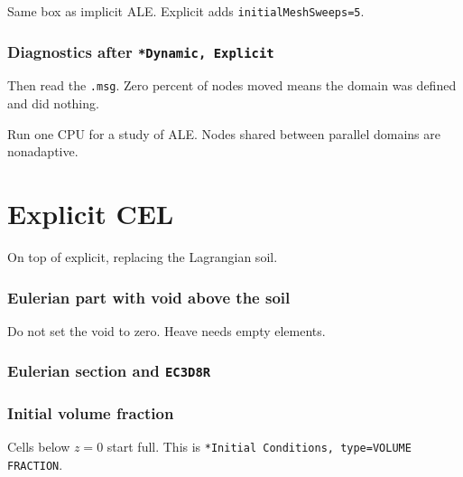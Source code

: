 \documentclass[11pt,a4paper]{article}
\begin{document}
Same box as implicit ALE. Explicit adds \texttt{initialMeshSweeps=5}.



\subsubsection*{Diagnostics after \texttt{*Dynamic, Explicit}}

Then read the \texttt{.msg}. Zero percent of nodes moved means the domain
was defined and did nothing.



Run one CPU for a study of ALE. Nodes shared between parallel domains are
nonadaptive.

\section{Explicit CEL}

On top of explicit, replacing the Lagrangian soil.

\subsubsection*{Eulerian part with void above the soil}

Do not set the void to zero. Heave needs empty elements.



\subsubsection*{Eulerian section and \texttt{EC3D8R}}



\subsubsection*{Initial volume fraction}

Cells below $z=0$ start full. This is
\texttt{*Initial Conditions, type=VOLUME FRACTION}.


\end{document}
